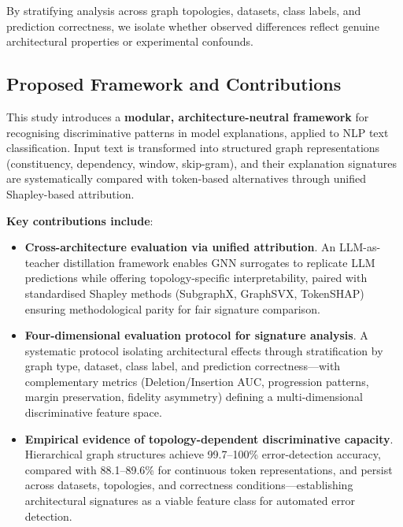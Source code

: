 \documentclass[preprint, times, review, 10pt]{elsarticle}
\begin{document}
By stratifying analysis across graph topologies, datasets, class labels, and prediction correctness, we isolate whether observed differences reflect genuine architectural properties or experimental confounds.



\subsection{Proposed Framework and Contributions}

This study introduces a \textbf{modular, architecture-neutral framework} for recognising discriminative patterns in model explanations, applied to NLP text classification. Input text is transformed into structured graph representations (constituency, dependency, window, skip-gram), and their explanation signatures are systematically compared with token-based alternatives through unified Shapley-based attribution.

\textbf{Key contributions include}:

\begin{itemize}
    \item \textbf{Cross-architecture evaluation via unified attribution}. An LLM-as-teacher distillation framework enables GNN surrogates to replicate LLM predictions while offering topology-specific interpretability, paired with standardised Shapley methods (SubgraphX, GraphSVX, TokenSHAP) ensuring methodological parity for fair signature comparison.

    \item \textbf{Four-dimensional evaluation protocol for signature analysis}. A systematic protocol isolating architectural effects through stratification by graph type, dataset, class label, and prediction correctness—with complementary metrics (Deletion/Insertion AUC, progression patterns, margin preservation, fidelity asymmetry) defining a multi-dimensional discriminative feature space.

    \item \textbf{Empirical evidence of topology-dependent discriminative capacity}. Hierarchical graph structures achieve 99.7–100\% error-detection accuracy, compared with 88.1–89.6\% for continuous token representations, and persist across datasets, topologies, and correctness conditions—establishing architectural signatures as a viable feature class for automated error detection.

\end{itemize}
\end{document}
